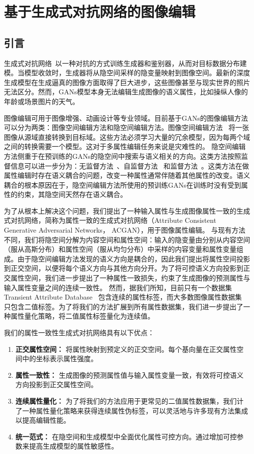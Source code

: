 \chapter{基于生成式对抗网络的图像编辑}

\section{引言}

生成式对抗网络~\cite{GANs}以一种对抗的方式训练生成器和鉴别器，从而对目标数据分布建模。当模型收敛时，生成器将从隐空间采样的隐变量映射到图像空间。最新的深度生成模型在生成逼真的图像方面取得了巨大进步，这些图像甚至与现实世界的照片无法区分。然而，GANs模型本身无法编辑生成图像的语义属性，比如操纵人像的年龄或场景图片的天气。

图像编辑可用于图像增强、动画设计等专业领域。目前基于GANs的图像编辑方法可以分为两类：图像空间编辑方法和隐空间编辑方法。图像空间编辑方法~\cite{cyclegan,i2i0,i2i1,i2i2} 将一张图像从源域直接转换到目标域。这些方法必须学习大量的冗余模型，因为每两个域之间的转换需要一个模型。这对于多属性编辑任务来说是灾难性的。
隐空间编辑方法侧重于在预训练的GANs的隐空间中搜索与语义相关的方向。这类方法按照监督信息可以进一步分为：无监督方法~\cite{icml2020,harkonen2020ganspace}、自监督方法~\cite{steer,variation} 和监督方法~\cite{interfacegan,iclr2021}。这类方法在做属性编辑时存在语义耦合的问题，改变一种属性通常伴随着其他属性的改变。语义耦合的根本原因在于，隐空间编辑方法所使用的预训练GANs在训练时没有受到属性的约束，其隐空间天然存在语义耦合。

为了从根本上解决这个问题，我们提出了一种输入属性与生成图像属性一致的生成式对抗网络，简称为属性一致的生成式对抗网络（Attribute Consistent Generative Adversarial Networks， ACGAN），用于图像属性编辑。
与现有方法不同，我们将隐空间分解为内容空间和属性空间：输入的隐变量由分别从内容空间（服从高斯分布）和属性空间（服从均匀分布）中采样的内容变量和属性变量组成。由于隐空间编辑方法发现的语义方向是耦合的，因此我们提出将属性空间投影到正交空间，以便将每个语义方向与其他方向分开。为了将可控语义方向投影到正交属性空间，我们进一步提出了一种属性一致损失，约束了生成图像的预测属性与输入属性变量之间的连续一致性。
然而，据我们所知，目前只有一个数据集Transient Attribute Database~\cite{scenedataset} 包含连续的属性标签，而大多数图像属性数据集~\cite{celeba,place,sun} 只包含二值标签。为了将我们的方法扩展到所有属性数据集，我们进一步提出了一种属性量化策略，将二值属性标签量化为连续值。

我们的属性一致性生成式对抗网络具有以下优点：
\begin{enumerate}
    \item \textbf{正交属性空间：} 将属性映射到预定义的正交空间。每个基向量在正交属性空间中的坐标表示属性强度。
    \item \textbf{属性一致性：} 生成图像的预测属性值与输入属性变量一致，有效将可控语义方向投影到正交属性空间。
    \item \textbf{连续属性量化：} 为了将我们的方法应用于更常见的二值属性数据集，我们计了一种属性量化策略来获得连续属性伪标签，可以灵活地与许多现有方法集成以提高编辑性能。
    \item \textbf{统一范式：} 在隐空间和生成模型中全面优化属性可控方向。通过增加可控参数来提高生成模型的属性敏感性。
\end{enumerate}

